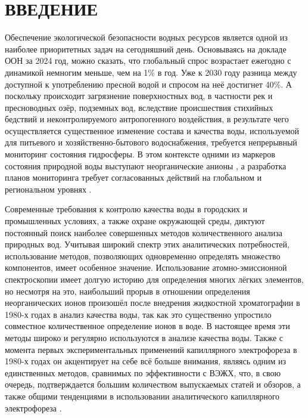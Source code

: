 \chapter*{ВВЕДЕНИЕ}

Обеспечение экологической безопасности водных ресурсов является одной из наиболее приоритетных задач на сегодняшний день. Основываясь на докладе ООН за 2024 год, можно сказать, что глобальный спрос возрастает ежегодно с динамикой немногим меньше, чем на 1\% в год. Уже к 2030 году разница между доступной к употреблению пресной водой и спросом на неё достигнет 40\%. А поскольку происходит загрязнение поверхностных вод, в частности рек и пресноводных озёр, подземных вод, вследствие происшествия стихийных бедствий и неконтролируемого антропогенного воздействия, в результате чего осуществляется существенное изменение состава и качества воды, используемой для питьевого и хозяйственно-бытового водоснабжения, требуется непрерывный мониторинг состояния гидросферы. В этом контексте одними из маркеров состояния природной воды выступают неорганические анионы \cite{unwaterWaterProsperityPeace2024}, а разработка планов мониторинга требует согласованных действий на глобальном и региональном уровнях \cite{kellyNOAAOceanicAtmospheric2025}.

Современные требования к контролю качества воды в городских и промышленных условиях, а также охране окружающей среды, диктуют постоянный поиск наиболее совершенных методов количественного анализа природных вод. Учитывая широкий спектр этих аналитических потребностей, использование методов, позволяющих одновременно определять множество компонентов, имеет особенное значение. Использование атомно-эмиссионной спектроскопии имеет долгую историю для определения многих лёгких элементов, но несмотря на это, наибольший прорыв в отношении определения неорганических ионов произошёл после внедрения жидкостной хроматографии в 1980-х годах в анализ качества воды, так как это существенно упростило совместное количественное определение ионов в воде. В настоящее время эти методы широко и регулярно используются в анализе качества воды. Также с момента первых экспериментальных применений капиллярного электрофореза в 1980-х годах он акцентирует на себе всё больше внимания, являясь одним из единственных методов, сравнимых по эффективности с ВЭЖХ, что, в свою очередь, подтверждается большим количеством выпускаемых статей и обзоров, а также общими тенденциями в использовании аналитического капиллярного электрофореза \cite{pobozyApplicationCapillaryElectrophoresis2021b}.

